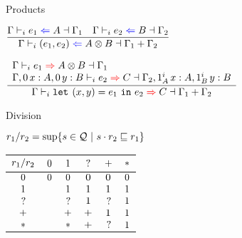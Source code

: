 \documentclass{beamer}
\begin{document}
\begin{frame}{Products}

\begin{center}
  $\infrule{\checktype{\Gamma}{e_1}{A}{\Gamma_1} \quad \checktype{\Gamma}{e_2}{B}{\Gamma_2}}{\checktype{\Gamma}{\pair{e_1}{e_2}}{\Prod{A}{B}}{\addctx{\Gamma_1}{\Gamma_2}}}$

  \vspace{2em}

  $\infrule{\begin{array}{l} \infertype{\Gamma}{e_1}{\Prod{A}{B}}{\Gamma_1} \\ \infertype{\extend{\extend{\Gamma}[\Zero]{x}{A}}[\Zero]{y}{B}}{e_2}{C}{\extend{\extend{\Gamma_2}[\totalqty{\One}{A}]{x}{A}}[\totalqty{\One}{B}]{y}{B}} \end{array}}{\infertype{\Gamma}{\letpair{x}{y}{e_1}{e_2}}{C}{\addctx{\Gamma_1}{\Gamma_2}}}$
\end{center}

\end{frame}

\begin{frame}{Division}

$r_1 / r_2 = \sup \{s \in \mathcal{Q} \ |\  s \cdot r_2 \sqsubseteq r_1 \}$

\begin{table}[ht]
  \centering
  \begin{tabular}{|c|c|c|c|c|c|}
  \hline
  $r_1 / r_2$ & $0$ & $1$  & $?$   & $+$ & $*$  \\ \hline
  $0$             & $0$ & $0$ & $0$  & $0$ & $0$ \\ \hline
  $1$              &         & $1$  & $1$   & $1$  & $1$  \\ \hline
  $?$              &         & $?$  & $1$   & $?$  & $1$  \\ \hline
  $+$             &         & $+$ & $+$  & $1$  & $1$  \\ \hline
  $*$              &         & $*$  & $+$  & $?$  & $1$  \\ \hline
  \end{tabular}
\end{table}

\end{frame}
\end{document}
